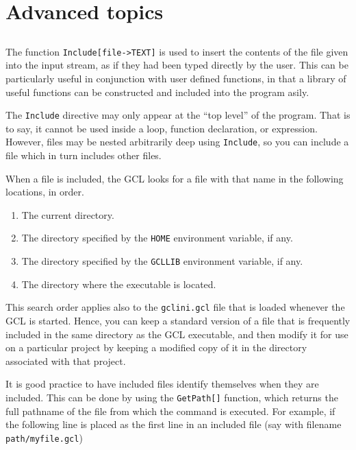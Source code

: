 \chapter{Advanced topics}

\section{}

The function \verb+Include[file->TEXT]+ is used to
insert the contents of the file given into the input stream, as if
they had been typed directly by the user.  This can be particularly
useful in conjunction with user defined functions, in that a library
of useful functions can be constructed and included into the program
asily.

The \verb+Include+ directive may only appear at the ``top level'' of
the program.  That is to say, it cannot be used inside a loop,
function declaration, or expression.  However, files may be nested
arbitrarily deep using {\tt Include}, so you can include a file which
in turn includes other files.
  
When a file is included, the GCL looks for a file with that name in
the following locations, in order.  
\begin{enumerate}
\item The current directory.
\item The directory specified by the \verb+HOME+ environment variable, if any.
\item The directory specified by the \verb+GCLLIB+ environment variable, if any.
\item The directory where the executable is located.
\end{enumerate}

This search order applies also to the \verb+gclini.gcl+ file that is
loaded whenever the GCL is started.  Hence, you can keep a standard
version of a file that is frequently included in the same directory as
the GCL executable, and then modify it for use on a particular project
by keeping a modified copy of it in the directory associated with that
project.  

It is good practice to have included files identify themselves when
they are included. This can be done by using the
\verb+GetPath[]+ function, which returns the full
pathname of the file from which the command is executed.  For example,
if the following line is placed as the first line in an included file
(say with filename \verb+path/myfile.gcl+)

